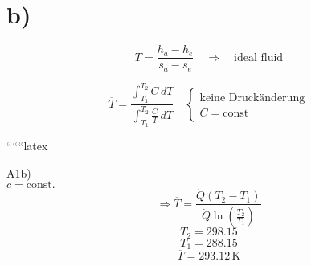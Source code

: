 

\section*{b)}

\[
\overline{T} = \frac{h_a - h_e}{s_a - s_e} \quad \Rightarrow \quad \text{ideal fluid}
\]

\[
\overline{T} = \frac{\int_{T_1}^{T_2} C \, dT}{\int_{T_1}^{T_2} \frac{C}{T} \, dT} \quad \left\{ \begin{array}{l} \text{keine Druckänderung} \\ C = \text{const} \end{array} \right.
\]

``````latex

A1b) \\
$c = \text{const.}$ \\
\[
\Rightarrow \overline{T} = \frac{\dot{Q}(T_2 - T_1)}{\dot{Q} \ln \left( \frac{T_2}{T_1} \right)}
\]
\[
T_2 = 298.15
\]
\[
T_1 = 288.15
\]
\[
\overline{T} = 293.12 \, \text{K}
\]